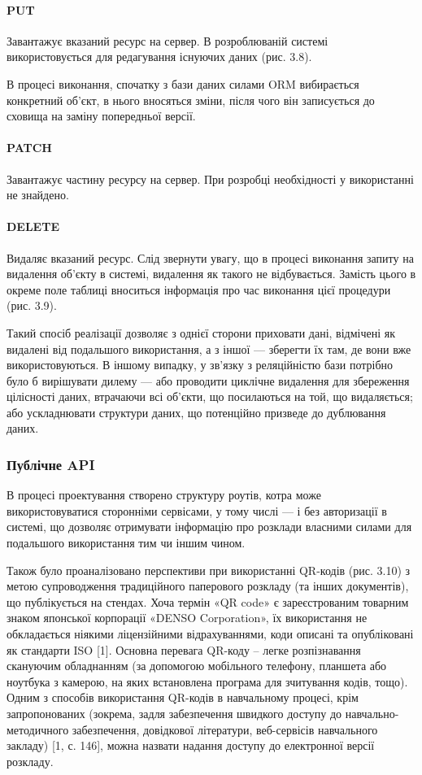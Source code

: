 \paragraph{PUT}

Завантажує вказаний ресурс на сервер. В розроблюваній системі використовується для редагування існуючих даних (рис. 3.8). 

В процесі виконання, спочатку з бази даних силами ORM вибирається конкретний об’єкт, в нього вносяться зміни, після чого він записується до сховища на заміну попередньої версії.

\paragraph{PATCH}

Завантажує частину ресурсу на сервер. При розробці необхідності у використанні не знайдено.

\paragraph{DELETE}

Видаляє вказаний ресурс.
Слід звернути увагу, що в процесі виконання запиту на видалення об’єкту в системі, видалення як такого не відбувається. Замість цього в окреме поле таблиці вноситься інформація про час виконання цієї процедури (рис. 3.9).

Такий спосіб реалізації дозволяє з однієї сторони приховати дані, відмічені як видалені від подальшого використання, а з іншої — зберегти їх там, де вони вже використовуються. В іншому випадку, у зв’язку з реляційністю бази потрібно було б вирішувати дилему — або проводити циклічне видалення для збереження цілісності даних, втрачаючи всі об’єкти, що посилаються на той, що видаляється; або ускладнювати структури даних, що потенційно призведе до дублювання даних.

\subsubsection{Публічне API}

В процесі проектування створено структуру роутів, котра може використовуватися сторонніми сервісами, у тому числі — і без авторизації в системі, що дозволяє отримувати інформацію про розклади власними силами для подальшого використання тим чи іншим чином. 

Також було проаналізовано перспективи при використанні QR-кодів (рис. 3.10) з метою супроводження традиційного паперового розкладу (та інших документів), що публікується на стендах. Хоча термін «QR code» є зареєстрованим товарним знаком японської корпорації «DENSO Corporation», їх використання не обкладається ніякими ліцензійними відрахуваннями, коди описані та опубліковані як стандарти ISO [1]. Основна перевага QR-коду – легке розпізнавання скануючим обладнанням (за допомогою мобільного телефону, планшета або ноутбука з камерою, на яких встановлена програма для зчитування кодів, тощо).
Одним з способів використання QR-кодів в навчальному процесі, крім запропонованих (зокрема, задля забезпечення швидкого доступу до навчально-методичного забезпечення, довідкової літератури, веб-сервісів навчального закладу) [1, с. 146],  можна назвати надання доступу до електронної версії розкладу.
